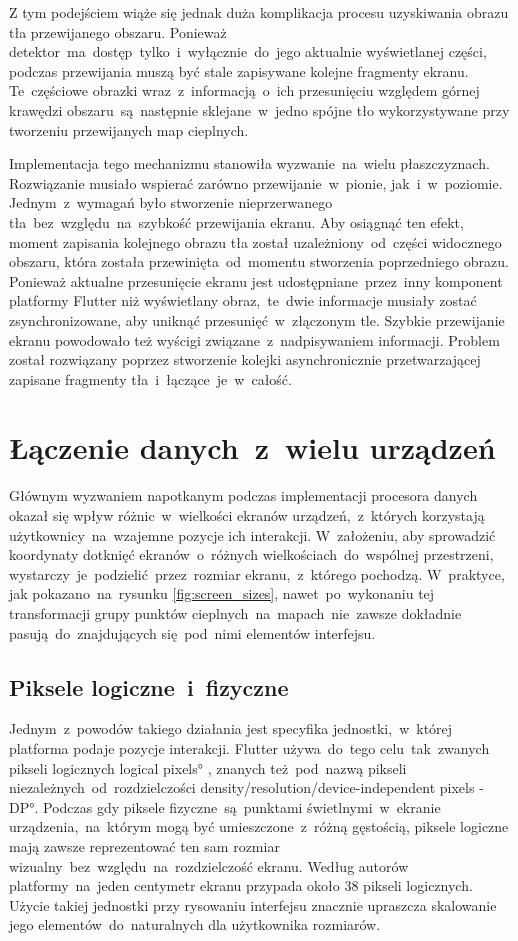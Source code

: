 Z tym podejściem wiąże się jednak duża komplikacja procesu uzyskiwania obrazu tła przewijanego obszaru. Ponieważ detektor~ma~dostęp~tylko~i~wyłącznie~do~jego aktualnie wyświetlanej części, podczas przewijania muszą być stale zapisywane kolejne fragmenty ekranu. Te~częściowe obrazki wraz~z~informacją~o~ich przesunięciu względem górnej krawędzi obszaru~są~następnie sklejane~w~jedno spójne tło wykorzystywane przy tworzeniu przewijanych map cieplnych.

Implementacja tego mechanizmu stanowiła wyzwanie~na~wielu płaszczyznach. Rozwiązanie musiało wspierać zarówno przewijanie~w~pionie, jak~i~w~poziomie. Jednym~z~wymagań było stworzenie nieprzerwanego tła~bez~względu~na~szybkość przewijania ekranu. Aby osiągnąć ten efekt, moment zapisania kolejnego obrazu tła został uzależniony~od~części widocznego obszaru, która została przewinięta~od~momentu stworzenia poprzedniego obrazu. Ponieważ aktualne przesunięcie ekranu jest udostępniane~przez~inny komponent platformy Flutter niż wyświetlany obraz,~te~dwie informacje musiały zostać zsynchronizowane, aby uniknąć przesunięć~w~złączonym tle. Szybkie przewijanie ekranu powodowało też wyścigi związane~z~nadpisywaniem informacji. Problem został rozwiązany poprzez stworzenie kolejki asynchronicznie przetwarzającej zapisane fragmenty tła~i~łączące~je~w~całość.

\section{Łączenie danych~z~wielu urządzeń}
Głównym wyzwaniem napotkanym podczas implementacji procesora danych okazał się wpływ różnic~w~wielkości ekranów urządzeń,~z~których korzystają użytkownicy~na~wzajemne pozycje ich interakcji. W~założeniu, aby sprowadzić koordynaty dotknięć ekranów~o~różnych wielkościach~do~wspólnej przestrzeni, wystarczy~je~podzielić~przez~rozmiar ekranu,~z~którego pochodzą. W~praktyce, jak pokazano~na~rysunku \ref{fig:screen_sizes}, nawet~po~wykonaniu tej transformacji grupy punktów cieplnych~na~mapach~nie~zawsze dokładnie pasują~do~znajdujących się~pod~nimi elementów interfejsu. 

\subsection{Piksele logiczne~i~fizyczne}
Jednym~z~powodów takiego działania jest specyfika jednostki,~w~której platforma podaje pozycje interakcji. Flutter używa~do~tego celu~tak~zwanych pikseli logicznych \ang{logical pixels} \cite{Logic_pixels}, znanych też~pod~nazwą pikseli niezależnych~od~rozdzielczości \ang{density/resolution/device-independent pixels - DP}. Podczas gdy piksele fizyczne~są~punktami świetlnymi~w~ekranie urządzenia,~na~którym mogą być umieszczone~z~różną gęstością, piksele logiczne mają zawsze reprezentować ten sam rozmiar wizualny~bez~względu~na~rozdzielczość ekranu. Według autorów platformy~na~jeden centymetr ekranu przypada około 38 pikseli logicznych. Użycie takiej jednostki przy rysowaniu interfejsu znacznie upraszcza skalowanie jego elementów~do~naturalnych dla użytkownika rozmiarów.

